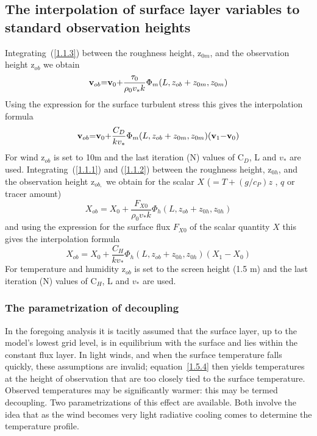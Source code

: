 \documentclass{UMDP_article}
\begin{document}
\subsection{The interpolation of surface layer variables to standard
  observation heights}\label{section_1.5}
Integrating~(\ref{1.1.3}) between the roughness height, z$_{0m}$, and
the observation height z$_{ob}$ we obtain
\begin{equation}
  {\rm {\bf v}}_{ob} { = } {\rm {\bf v}}_{0} { +
  }\frac{ {\rm {\bf \tau }}_{0} }{ \rho _0 v_\ast k} \Phi _m (L,
  z_{ob} + z_{0m} , z_{0m} )
  \label{1.5.1}
\end{equation}
Using the expression for the surface turbulent stress this gives the
interpolation formula
\begin{equation}
  {\rm {\bf v}}_{ob} { = } {\rm {\bf v}}_{0} { +
  }\frac{ C_D }{k v_\ast } \Phi _m (L, z_{ob} + z_{0m} , z_{0m} ) (
  {\rm {\bf v}}_{1} { - } {\rm {\bf v}}_{0} {)}
  \label{1.5.2}
\end{equation}
For wind z$_{ob}$ is set to 10m and the last iteration (N) values of
C$_{D}$, L and $v_{\ast }$ are used.  Integrating~(\ref{1.1.1}) and
(\ref{1.1.2}) between the roughness height, z$_{0h}$, and the
observation height z$_{ob, }$ we obtain for the scalar $X$
($=T+(g/c_{P})z$ , $q$ or tracer amount)
\begin{equation}
  X_{ob} =  X_0 + \frac{ F_{X0} }{ \rho _0  v_\ast k}  \Phi _h (L,  z_{ob} +  z_{0h} ,  z_{0h} )
  \label{1.5.3}
\end{equation}
and using the expression for the surface flux $F_{X0}$ of the scalar
quantity $X$ this gives the interpolation formula
\begin{equation}
  X_{ob} =  X_0 + \frac{ C_H }{k v_\ast }  \Phi _h (L,  z_{ob} +  z_{0h} ,  z_{0h} ) ( X_1 -  X_0 )
  \label{1.5.4}
\end{equation}
For temperature and humidity z$_{ob}$ is set to the screen height (1.5
m) and the last iteration (N) values of C$_{H}$, L and $v_{\ast }$ are
used.

\subsubsection{The parametrization of decoupling}

In the foregoing analysis it is tacitly assumed that the surface
layer, up to the model's lowest grid level, is in equilibrium with the
surface and lies within the constant flux layer. In light winds, and
when the surface temperature falls quickly, these assumptions are
invalid; equation~\ref{1.5.4} then yields temperatures at the height
of observation that are too closely tied to the surface
temperature. Observed temperatures may be significantly warmer: this
may be termed decoupling. Two parametrizations of this effect are
available. Both involve the idea that as the wind becomes very light
radiative cooling comes to determine the temperature profile.
\end{document}
